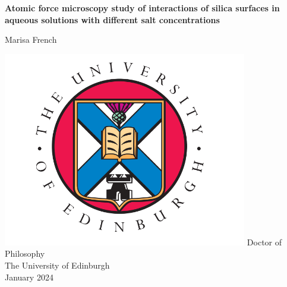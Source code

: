\documentclass[a4paper,12pt,oneside,openright]{book}
\begin{document}
%

\parindent=0pt          %
\parskip=5pt            %
%
%

\begin{titlepage}
    \centering
    \vspace*{1cm}

    \Huge
    \textbf{Atomic force microscopy study of interactions of silica surfaces in aqueous solutions with different salt concentrations}

    \vspace{1cm}
    \LARGE
    Marisa French

    \vspace{1cm}
    \includegraphics[width=0.8\textwidth]{thesis-frontmatter/Crest.png}
    \vfill
    \Large
    Doctor of Philosophy\\
    The University of Edinburgh\\
    \vspace{1.5cm}
    January 2024

    \vspace*{1cm}
\end{titlepage}
%
%              
\end{document}
